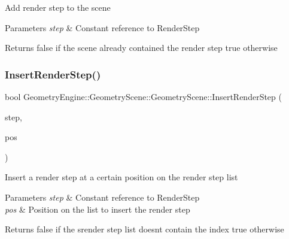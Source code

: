 Add render step to the scene 
\begin{DoxyParams}{Parameters}
{\em step} & Constant reference to Render\+Step \\
\hline
\end{DoxyParams}
\begin{DoxyReturn}{Returns}
false if the scene already contained the render step true otherwise 
\end{DoxyReturn}
\mbox{\label{class_geometry_engine_1_1_geometry_scene_1_1_geometry_scene_aed4a5446836e0430fb1a295f760062f6}} 
\subsubsection{\texorpdfstring{InsertRenderStep()}{InsertRenderStep()}}
{\footnotesize\ttfamily bool Geometry\+Engine\+::\+Geometry\+Scene\+::\+Geometry\+Scene\+::\+Insert\+Render\+Step (\begin{DoxyParamCaption}\item[{const \mbox{\hyperlink{class_geometry_engine_1_1_geometry_render_step_1_1_render_step}{Geometry\+Render\+Step\+::\+Render\+Step}} \&}]{step,  }\item[{unsigned int}]{pos }\end{DoxyParamCaption})\hspace{0.3cm}{\ttfamily [virtual]}}

Insert a render step at a certain position on the render step list 
\begin{DoxyParams}{Parameters}
{\em step} & Constant reference to Render\+Step \\
\hline
{\em pos} & Position on the list to insert the render step \\
\hline
\end{DoxyParams}
\begin{DoxyReturn}{Returns}
false if the srender step list doesn\textquotesingle{}t contain the index true otherwise 
\end{DoxyReturn}
\mbox{\label{class_geometry_engine_1_1_geometry_scene_1_1_geometry_scene_ae5607835364c78780386efb5dbde3fff}} 
